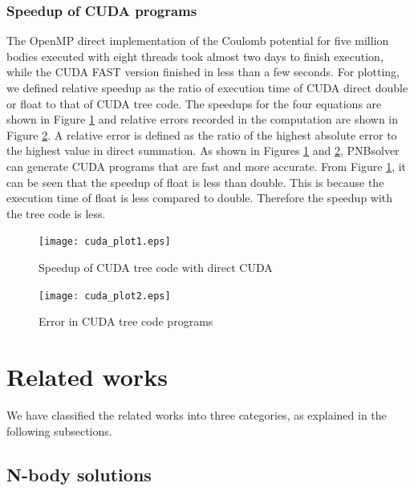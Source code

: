 \documentclass[draftclsnofoot]{elsarticle}
\begin{document}
\subsubsection{Speedup of CUDA programs}
The OpenMP direct implementation of the Coulomb potential for five million bodies executed with eight threads took almost two days to finish execution, while the CUDA FAST
version finished in less than a few seconds. For plotting, we defined relative speedup as the ratio of execution time of CUDA direct double or float to that of CUDA tree code. The speedups
for the four equations are shown in Figure \ref{fig_cuda1} and relative errors recorded in the computation are shown in Figure \ref{fig_cuda2}. A relative error is defined
as the ratio of the highest absolute error to the highest value in direct summation. As shown in Figures \ref{fig_cuda1} and \ref{fig_cuda2}, PNBsolver can generate 
CUDA programs that are fast and more accurate. From Figure \ref{fig_cuda1}, it can be seen that the speedup of float is less than
double. This is because the execution time of float is less compared to double. Therefore  the speedup with the tree code is less. 

\begin{figure}[!t]
\centering
\texttt{[image: cuda\_plot1.eps]}
\caption{Speedup of CUDA tree code with direct CUDA}
\label{fig_cuda1}
\end{figure}

\begin{figure}[!t]
\centering
\texttt{[image: cuda\_plot2.eps]}
\caption{Error in  CUDA tree code programs}
\label{fig_cuda2}
\end{figure}

\section{Related works}
\label{related}

We have classified the related works into three categories, as explained in the following subsections. 

\subsection{N-body solutions}
\end{document}
